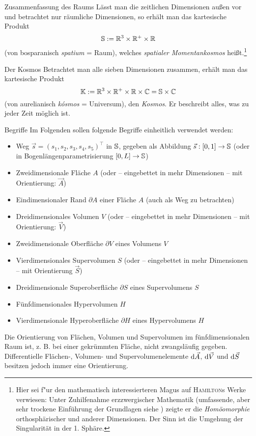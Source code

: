 \begin{bla}{Zusammenfassung des Raums}
Lässt man die zeitlichen Dimensionen außen vor und betrachtet nur räumliche Dimensionen, so erhält man das kartesische Produkt
\begin{equation}
\mathbb{S}:=\mathbb{R}^3\times\mathbb{R}^+\times\mathbb{R}
\end{equation}
(von bosparanisch \emph{spatium} = Raum), welches \emph{spatialer Momentankosmos} heißt.\footnote{Hier sei f"ur den mathematisch interessierteren Magus auf \textsc{Hamilton}s Werke verwiesen: Unter Zuhilfenahme erzzwergischer Mathematik (umfassende, aber sehr trockene Einführung der Grundlagen siehe \cite{erzzwerge}) zeigte er die \emph{Homöomorphie} orthosphärischer und anderer Dimensionen. Der Sinn ist die Umgehung der Singularität in der 1. Sphäre.}
\end{bla}
\begin{bla}{Der Kosmos}
Betrachtet man alle sieben Dimensionen zusammen, erhält man das kartesische Produkt
\begin{equation}
\mathbb{K}:=\mathbb{R}^3\times\mathbb{R}^+\times\mathbb{R}\times\mathbb{C}=\mathbb{S}\times\mathbb{C}
\end{equation}
(von aurelianisch \emph{kósmos} = Universum), den \emph{Kosmos}. Er beschreibt alles, was zu jeder Zeit möglich ist.
\end{bla}
\begin{bla}{Begriffe}
Im Folgenden sollen folgende Begriffe einheitlich verwendet werden:
\begin{itemize}
\item
Weg $\vec{s}=(s_1,s_2,s_3,s_4,s_5)^\top$ in $\mathbb{S}$, gegeben als Abbildung $\vec{s}: [0,1]\to\mathbb{S}$ (oder in Bogenlängenparametrisierung $[0,L]\to\mathbb{S}$)
\item
Zweidimensionale Fläche $A$ (oder -- eingebettet in mehr Dimensionen -- mit Orientierung: $\vec{A}$)
\item
Eindimensionaler Rand $\partial A$ einer Fläche $A$ (auch als Weg zu betrachten)
\item
Dreidimensionales Volumen $V$ (oder -- eingebettet in mehr Dimensionen -- mit Orientierung: $\vec{V}$)
\item
Zweidimensionale Oberfläche $\partial V$ eines Volumens $V$
\item
Vierdimensionales Supervolumen $S$ (oder -- eingebettet in mehr Dimensionen -- mit Orientierung $\vec{S}$)
\item
Dreidimensionale Superoberfläche $\partial S$ eines Supervolumens $S$
\item
Fünfdimensionales Hypervolumen $H$
\item
Vierdimensionale Hyperoberfläche $\partial H$ eines Hypervolumens $H$
\end{itemize}
Die Orientierung von Flächen, Volumen und Supervolumen im fünfdimensionalen Raum ist, z. B. bei einer gekrümmten Fläche, nicht zwangsläufig gegeben. Differentielle Flächen-, Volumen- und Supervolumenelemente $\text{\rmfamily d} \vec{A}$, $\text{\rmfamily d} \vec{V}$ und $\text{\rmfamily d} \vec{S}$ besitzen jedoch immer eine Orientierung.
\end{bla}
